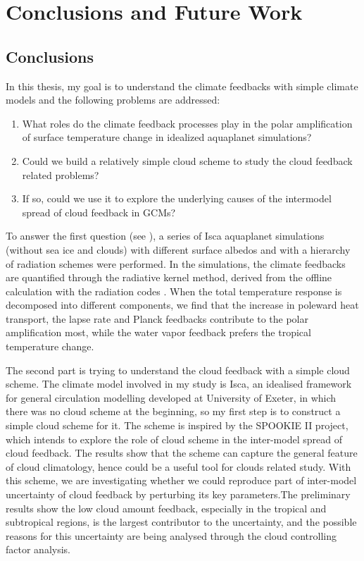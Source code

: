 \chapter{Conclusions and Future Work}
\label{ch:conclusion}

\section{Conclusions}
In this thesis, my goal is to understand the climate feedbacks with simple climate models and the following problems are addressed: 
\begin{enumerate}
    \item What roles do the climate feedback processes play in the polar amplification of surface temperature change in idealized aquaplanet simulations?
    \item Could we build a relatively simple cloud scheme to study the cloud feedback related problems?
    \item If so, could we use it to explore the underlying causes of the intermodel spread of cloud feedback in GCMs? 
\end{enumerate}

To answer the first question (see ), a series of Isca \citep{Vallis2018} aquaplanet simulations (without sea ice and clouds) with different surface albedos and with a hierarchy of radiation schemes were performed. In the simulations, the climate feedbacks are quantified through the radiative kernel method, derived from the offline calculation with the radiation codes \citep{Liu2020kernel}. When the total temperature response is decomposed into different components, we find that the increase in poleward heat transport, the lapse rate and Planck feedbacks contribute to the polar amplification most, while the water vapor feedback prefers the tropical temperature change.


The second part is trying to understand the cloud feedback with a simple cloud scheme.  The climate model involved in my study is Isca, an idealised framework for general circulation modelling developed at University of Exeter, in which there was no cloud scheme at the beginning, so my first step is to construct a simple cloud scheme for it. The scheme is inspired by the SPOOKIE II project, which intends to explore the role of cloud scheme in the inter-model spread of cloud feedback.  The results show that the scheme can capture the general feature of cloud climatology, hence could be a useful tool for clouds related study.  With this scheme, we are investigating whether we could reproduce part of inter-model uncertainty of cloud feedback by perturbing its key parameters.The preliminary results show the low cloud amount feedback, especially in the tropical and subtropical regions, is the largest contributor to the uncertainty, and the possible reasons for this uncertainty are being analysed through the cloud controlling factor analysis.

